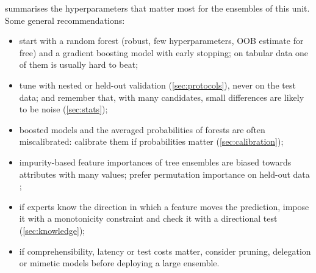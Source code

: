  summarises the hyperparameters that matter most for the ensembles of this
unit. Some general recommendations:
\begin{itemize}
  \item start with a random forest (robust, few hyperparameters, OOB estimate for free) and a
        gradient boosting model with early stopping; on tabular data one of them is usually
        hard to beat;
  \item tune with nested or held-out validation (\cref{sec:protocols}), never on the test data;
        and remember that, with many candidates, small differences are likely to be noise
        (\cref{sec:stats});
  \item boosted models and the averaged probabilities of forests are often miscalibrated:
        calibrate them if probabilities matter (\cref{sec:calibration});
  \item impurity-based feature importances of tree ensembles are biased towards attributes with
        many values; prefer permutation importance on held-out data \citep{strobl2007bias};
  \item if experts know the direction in which a feature moves the prediction, impose it with a
monotonicity constraint and check it with a directional test (\cref{sec:knowledge});
\item if comprehensibility, latency or test costs matter, consider pruning, delegation or
        mimetic models before deploying a large ensemble.
\end{itemize}

